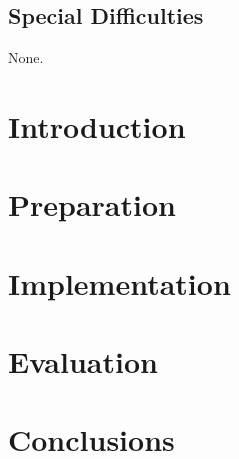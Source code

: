 \documentclass[12pt,a4paper,twoside,openright]{report}
\begin{document}
\section*{Special Difficulties}

None.

\newpage 

\tableofcontents


\newpage
{}
\setcounter{page}{1}







\chapter{Introduction}


\chapter{Preparation}


\chapter{Implementation}


\chapter{Evaluation}


\chapter{Conclusions}

\end{document}
